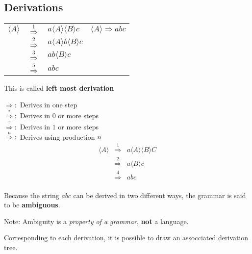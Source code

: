 \documentclass[a4paper,12pt]{article}
\newcommand{\nonterminal}[1]{$\langle #1 \rangle$}
\begin{document}
\subsection*{Derivations}

\begin{tabular}{lcl|l}
$\langle A \rangle$	&	$\stackrel{1}{\Rightarrow}$	&	$a \langle A \rangle
\langle B \rangle c$	&	$\langle A \rangle \Rightarrow abc$ \\
							&	$\stackrel{2}{\Rightarrow}$	&	$a \langle A \rangle
b \langle B \rangle c$	&	 \\	
							&	$\stackrel{3}{\Rightarrow}$	&	$a b \langle B \rangle c$	&	 \\
							&	$\stackrel{5}{\Rightarrow}$	&	$a b c $	&	\\
\end{tabular}

This is called \textbf{left most derivation}

$\Rightarrow : $ Derives in one step \\
$\stackrel{*}{\Rightarrow} : $ Derives in $0$ or more steps \\
$\stackrel{+}{\Rightarrow} : $ Derives in $1$ or more steps \\
$\stackrel{n}{\Rightarrow} : $ Derives using production $n$ \\

\begin{eqnarray*}
\langle A \rangle &	\stackrel{1}{\Rightarrow}	&	a \langle A \rangle \langle B \rangle C \\
						&	\stackrel{2}{\Rightarrow}	&	a \langle B \rangle c \\
						&	\stackrel{4}{\Rightarrow}	&	abc	\\
\end{eqnarray*}

Because the string $abc$ can be derived in two different ways, the
grammar is said to be \textbf{ambiguous}.

Note: Ambiguity is a \emph{property of a grammar}, \textbf{not} a
language.

Corresponding to each derivation, it is possible to draw an assocciated
derivation tree.

\begin{figure}[ht]


\pstree{\TR{\nonterminal{A}}}{
	\TR{$a$}
	\pstree{\TR{\nonterminal{A}}}{
		\pstree{\TR{\nonterminal{A}}}{
				\TR{$e$}
				\Tn
		}
	\TR{$b$}
	}
	\pstree{\TR{\nonterminal{B}}}{
		\Tn
		\TR{$\epsilon$}
	}
	\TR{$c$}
}

\end{figure}
\end{document}
